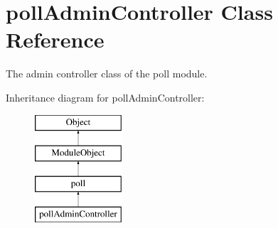 \hypertarget{classpollAdminController}{}\section{poll\+Admin\+Controller Class Reference}
\label{classpollAdminController}


The admin controller class of the poll module.  


Inheritance diagram for poll\+Admin\+Controller\+:\begin{figure}[H]
\begin{center}
\leavevmode
\includegraphics[height=4.000000cm]{classpollAdminController}
\end{center}
\end{figure}
